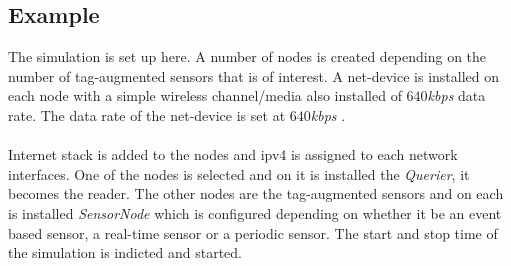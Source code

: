 \subsection{Example}
The simulation is set up here. A number of nodes is created depending on the number of
tag-augmented sensors that is of interest. A net-device is installed on each node with
a simple wireless channel/media also installed of $640$\textit{kbps} data rate.
The data rate of the net-device is set at $640$\textit{kbps} \cite{epcglobal}.\\\\
Internet stack is added to the nodes and ipv4 is assigned to each network interfaces.
One of the nodes is selected and on it is installed the \textit{Querier}, it becomes
the reader. The other nodes are the tag-augmented sensors and on each is installed
\textit{SensorNode} which is configured depending on whether it be an event based
sensor, a real-time sensor or a periodic sensor. The start and stop time of the
simulation is indicted and started.

